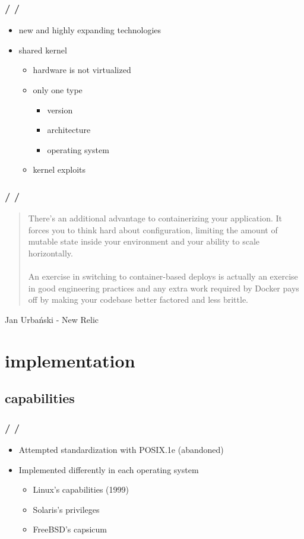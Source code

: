 \documentclass{beamer}
\newcommand{\autotitle}
{\frametitle{
    \secname
    \ifx\insertsubsection\empty
    \else
        /\subsecname
        \ifx\insertsubsubsection\empty\else/\subsubsecname\fi
    \fi}}
\begin{document}
\begin{frame}
    \autotitle
    \begin{itemize}
        \item new and highly expanding technologies
        \item shared kernel
        \begin{itemize}
            \item hardware is not virtualized
            \item only one type
            \begin{itemize}
                \item version
                \item architecture
                \item operating system
            \end{itemize}
            \item kernel exploits
        \end{itemize}
    \end{itemize}
\end{frame}

\begin{frame}
    \autotitle
    \begin{quote}
        There’s an additional advantage to containerizing your application. It
        forces you to think hard about configuration, limiting the amount of
        mutable state inside your environment and your ability to scale
        horizontally.
        \\~\\
        An exercise in switching to container-based deploys is actually an
        exercise in good engineering practices and any extra work required by
        Docker pays off by making your codebase better factored and less
        brittle.
    \end{quote}
    Jan Urbański - New Relic
\end{frame}

\section{implementation}

\subsection{capabilities}

\begin{frame}
    \autotitle
    \begin{itemize}
        \item Attempted standardization with POSIX.1e (abandoned)
        \item Implemented differently in each operating system
        \begin{itemize}
            \item Linux's capabilities (1999)
            \item Solaris's privileges
            \item FreeBSD's capsicum
        \end{itemize}
    \end{itemize}
\end{frame}
\end{document}
